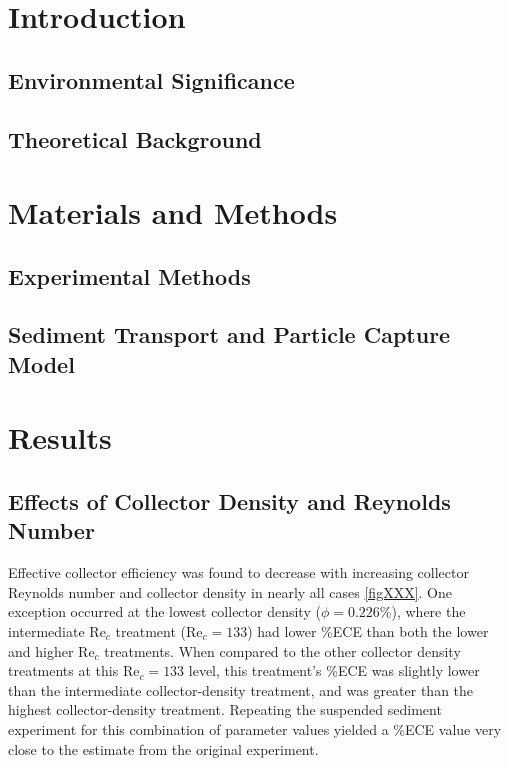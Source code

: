 \documentclass[geosciences,article,submit,moreauthors,pdftex]{Definitions/mdpi}
\newcommand\Rey{\mathrm{Re}}
\begin{document}
\section{Introduction}

\cite{Fauria_2015}

\subsection{Environmental Significance}

\subsection{Theoretical Background}

\section{Materials and Methods}

\subsection{Experimental Methods}

\subsection{Sediment Transport and Particle Capture Model}

\section{Results}

\subsection{Effects of Collector Density and Reynolds Number}

Effective collector efficiency was found to decrease with increasing collector Reynolds number and collector density in nearly all cases \ref{figXXX}. One exception occurred at the lowest collector density ($\phi = 0.226\%$), where the intermediate $\Rey_c$ treatment ($\Rey_c = 133$) had lower \%ECE than both the lower and higher $\Rey_c$ treatments. When compared to the other collector density treatments at this $\Rey_c = 133$ level, this treatment's \%ECE was slightly lower than the intermediate collector-density treatment, and was greater than the highest collector-density treatment. Repeating the suspended sediment experiment for this combination of parameter values yielded a \%ECE value very close to the estimate from the original experiment.
\end{document}
